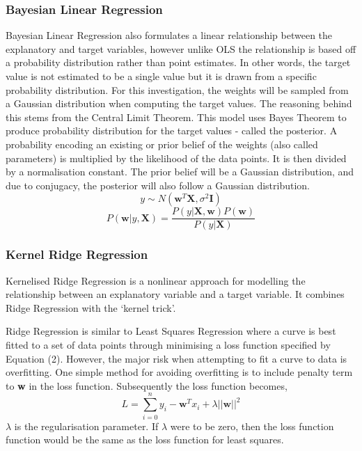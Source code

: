 \documentclass[a4paper,11pt,twoside]{article}
\begin{document}
\subsubsection{Bayesian Linear Regression}
Bayesian Linear Regression also formulates a linear relationship between the explanatory and target variables, however unlike OLS the relationship is based off a probability distribution rather than point estimates. In other words, the target value is not estimated to be a single value but it is drawn from a specific probability distribution. For this investigation, the weights will be sampled from a Gaussian distribution when computing the target values. The reasoning behind this stems from the Central Limit Theorem. This model uses Bayes Theorem to produce probability distribution for the target values - called the posterior. A probability encoding an existing or prior belief of the weights (also called parameters) is multiplied by the likelihood of the data points. It is then divided by a normalisation constant. The prior belief will be a Gaussian distribution, and due to conjugacy, the posterior will also follow a Gaussian distribution. 
\begin{equation}
 y \sim N(\textbf{w}^T\textbf{X}, \sigma^2\textbf{I})
\end{equation}
\begin{equation}
P(\textbf{w}|y,\textbf{X}) = \frac{P(y|\textbf{X},\textbf{w})P(\textbf{w})}{P(y|\textbf{X})}
\end{equation}

\subsubsection{Kernel Ridge Regression}

Kernelised Ridge Regression is a nonlinear approach for modelling the relationship between an explanatory variable and a target variable. It combines Ridge Regression with the `kernel trick'.

Ridge Regression is similar to Least Squares Regression where a curve is best fitted to a set of data points through minimising a loss function specified by Equation (2). However, the major risk when attempting to fit a curve to data is overfitting. One simple method for avoiding overfitting is to include penalty term to \textbf{w} in the loss function. Subsequently the loss function becomes, 
\begin{equation}
L = \sum_{i=0}^{n}y_{i} - \textbf{w}^Tx_{i} + \lambda||\textbf{w}||^2
\end{equation}
$\lambda$ is the regularisation parameter. If $\lambda$ were to be zero, then the loss function function would be the same as the loss function for least squares.
\end{document}
